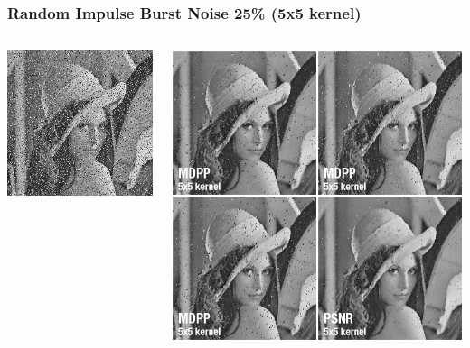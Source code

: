\documentclass{beamer}
\begin{document}
	
		\begin{frame}[t,fragile]
		\frametitle{Random Impulse Burst Noise 25\% (5x5 kernel)}
		
		\begin{columns}[onlytextwidth]
			\begin{column}{0.3\textwidth}
				\includegraphics[width=\textwidth]{img/ribn.jpg}
			
			\end{column}

			\begin{column}{0.6\textwidth}
				\includegraphics[width=\textwidth]{img/best25_ribn.jpg}
			\end{column}
		\end{columns}
			
	\end{frame}	
	
\end{document}

